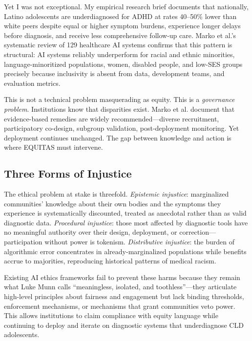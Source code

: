 \documentclass[12pt,a4paper]{article}
\begin{document}
Yet I was not exceptional. My empirical research brief documents that nationally, Latino adolescents are underdiagnosed for ADHD at rates 40--50\% lower than white peers despite equal or higher symptom burdens, experience longer delays before diagnosis, and receive less comprehensive follow-up care.\cite{garcia_ed415} Marko et al.'s systematic review of 129 healthcare AI systems confirms that this pattern is structural: AI systems reliably underperform for racial and ethnic minorities, language-minoritized populations, women, disabled people, and low-SES groups precisely because inclusivity is absent from data, development teams, and evaluation metrics.\cite{marko2025}

This is not a technical problem masquerading as equity. This is a \textit{governance problem}. Institutions know that disparities exist. Marko et al. document that evidence-based remedies are widely recommended—diverse recruitment, participatory co-design, subgroup validation, post-deployment monitoring.\cite{marko2025} Yet deployment continues unchanged. The gap between knowledge and action is where EQUITAS must intervene.

\subsection{Three Forms of Injustice}

The ethical problem at stake is threefold. \textit{Epistemic injustice}: marginalized communities' knowledge about their own bodies and the symptoms they experience is systematically discounted, treated as anecdotal rather than as valid diagnostic data.\cite{garcia_ed415} \textit{Procedural injustice}: those most affected by diagnostic tools have no meaningful authority over their design, deployment, or correction—participation without power is tokenism.\cite{nadarzynski2024} \textit{Distributive injustice}: the burden of algorithmic error concentrates in already-marginalized populations while benefits accrue to majorities, reproducing historical patterns of medical racism.\cite{marko2025}

Existing AI ethics frameworks fail to prevent these harms because they remain what Luke Munn calls ``meaningless, isolated, and toothless''—they articulate high-level principles about fairness and engagement but lack binding thresholds, enforcement mechanisms, or mechanisms that grant communities veto power.\cite{munn_idai700} This allows institutions to claim compliance with equity language while continuing to deploy and iterate on diagnostic systems that underdiagnose CLD adolescents.
\end{document}
